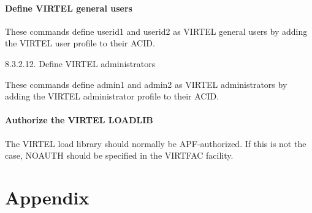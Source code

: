 \documentclass[letterpaper,10pt,english]{sphinxmanual}
\begin{document}
\subsubsection{Define VIRTEL general users}
\label{\detokenize{Installation_Guide:define-virtel-general-users}}
\begin{sphinxVerbatim}[commandchars=\\\{\}]
  
  
\end{sphinxVerbatim}


These commands define userid1 and userid2 as VIRTEL general users by adding the VIRTEL user profile to their ACID.

8.3.2.12. Define VIRTEL administrators

\begin{sphinxVerbatim}[commandchars=\\\{\}]
  
  
\end{sphinxVerbatim}


These commands define admin1 and admin2 as VIRTEL administrators by adding the VIRTEL administrator profile to their ACID.

\ignorespaces 

\subsubsection{Authorize the VIRTEL LOADLIB}
\label{\detokenize{Installation_Guide:authorize-the-virtel-loadlib}}\label{\detokenize{Installation_Guide:index-186}}
The VIRTEL load library should normally be APF-authorized. If this is not the case, NOAUTH should be specified in the VIRTFAC facility.


\chapter{Appendix}
\label{\detokenize{Installation_Guide:appendix}}
\ignorespaces 
\end{document}

